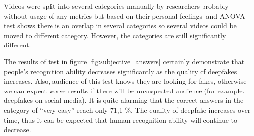 Videos were split into several categories manually by researchers probably without usage of any metrics but based on their personal feelings, and ANOVA test shows there is an overlap in several categories so several videos could be moved to different category. However, the categories are still significantly different. 

The results of test in figure \ref{fig:subjective_answers} certainly demonstrate that people's recognition ability decreases significantly as the quality of deepfakes increases. Also, audience of this test knows they are looking for fakes, otherwise we can expect worse results if there will be unsuspected audience (for example: deepfakes on social media). It is quite alarming that the correct answers in the category of “very easy” reach only 71,1 \%. The quality of deepfake increases over time, thus it can be expected that human recognition ability will continue to decrease. \cite{TheThreatOfDeepfakes}


